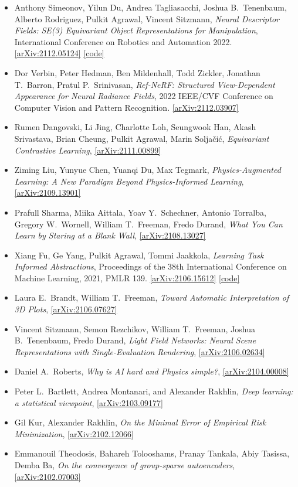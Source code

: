 \begin{itemize}
\item Anthony Simeonov, Yilun Du, Andrea Tagliasacchi, Joshua B.\  Tenenbaum, Alberto Rodriguez, Pulkit Agrawal, Vincent Sitzmann, \textit{Neural Descriptor Fields: SE(3) Equivariant Object Representations for Manipulation}, International Conference on Robotics and Automation 2022. \href{https://arxiv.org/abs/2112.05124}{[arXiv:2112.05124]}  \href{https://yilundu.github.io/ndf/}{[code]} 
\item Dor Verbin, Peter Hedman, Ben Mildenhall, Todd Zickler, Jonathan T.\  Barron, Pratul P.\  Srinivasan, \textit{Ref-NeRF: Structured View-Dependent Appearance for Neural Radiance Fields}, 2022 IEEE/CVF Conference on Computer Vision and Pattern Recognition. \href{https://arxiv.org/abs/2112.03907}{[arXiv:2112.03907]} 
\item Rumen Dangovski, Li Jing, Charlotte Loh, Seungwook Han, Akash Srivastava, Brian Cheung, Pulkit Agrawal, Marin Soljačić, \textit{Equivariant Contrastive Learning}, \href{https://arxiv.org/abs/2111.00899}{[arXiv:2111.00899]} 
\item Ziming Liu, Yunyue Chen, Yuanqi Du, Max Tegmark, \textit{Physics-Augmented Learning: A New Paradigm Beyond Physics-Informed Learning}, \href{https://arxiv.org/abs/2109.13901}{[arXiv:2109.13901]} 
\item Prafull Sharma, Miika Aittala, Yoav Y.\  Schechner, Antonio Torralba, Gregory W.\  Wornell, William T.\  Freeman, Fredo Durand, \textit{What You Can Learn by Staring at a Blank Wall}, \href{https://arxiv.org/abs/2108.13027}{[arXiv:2108.13027]} 
\item Xiang Fu, Ge Yang, Pulkit Agrawal, Tommi Jaakkola, \textit{Learning Task Informed Abstractions}, Proceedings of the 38th International Conference on Machine Learning, 2021, PMLR 139. \href{https://arxiv.org/abs/2106.15612}{[arXiv:2106.15612]}  \href{https://xiangfu.co/tia}{[code]} 
\item Laura E.\  Brandt, William T.\  Freeman, \textit{Toward Automatic Interpretation of 3D Plots}, \href{https://arxiv.org/abs/2106.07627}{[arXiv:2106.07627]} 
\item Vincent Sitzmann, Semon Rezchikov, William T.\  Freeman, Joshua B.\  Tenenbaum, Fredo Durand, \textit{Light Field Networks: Neural Scene Representations with Single-Evaluation Rendering}, \href{https://arxiv.org/abs/2106.02634}{[arXiv:2106.02634]} 
\item Daniel A.\  Roberts, \textit{Why is AI hard and Physics simple?}, \href{https://arxiv.org/abs/2104.00008}{[arXiv:2104.00008]} 
\item Peter L.\  Bartlett, Andrea Montanari, and Alexander Rakhlin, \textit{Deep learning: a statistical viewpoint}, \href{https://arxiv.org/abs/2103.09177}{[arXiv:2103.09177]} 
\item Gil Kur, Alexander Rakhlin, \textit{On the Minimal Error of Empirical Risk Minimization}, \href{https://arxiv.org/abs/2102.12066}{[arXiv:2102.12066]} 
\item Emmanouil Theodosis, Bahareh Tolooshams, Pranay Tankala, Abiy Tasissa, Demba Ba, \textit{On the convergence of group-sparse autoencoders}, \href{https://arxiv.org/abs/2102.07003}{[arXiv:2102.07003]} 
\end{itemize}